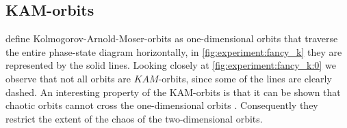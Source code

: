 \subsection{KAM-orbits}
\label{ss:b:kam}
\citeauthor{kenzel1997physics} define Kolmogorov-Arnold-Moser-orbits as one-dimensional orbits that traverse the entire phase-state diagram horizontally, in \cref{fig:experiment:fancy_k} they are represented by the solid lines. Looking closely at \cref{fig:experiment:fancy_k:0} we observe that not all orbits are $KAM$-orbits, since some of the lines are clearly dashed. An interesting property of the KAM-orbits is that it can be shown that chaotic orbits cannot cross the one-dimensional orbits \cite{kenzel1997physics}. Consequently they restrict the extent of the chaos of the two-dimensional orbits.\\

